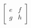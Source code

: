 \documentclass[preview]{standalone}
\begin{document}
\begin{align*}
\begin{bmatrix} e & f \\ g & h \end{bmatrix}
\end{align*}
\end{document}
